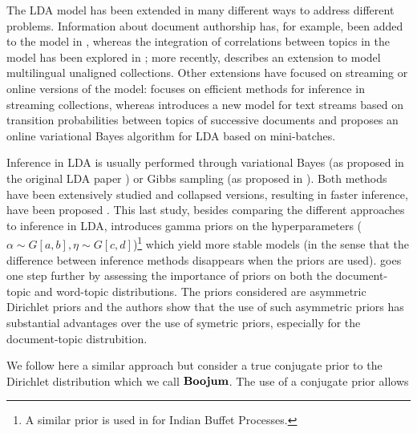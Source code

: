 
The LDA model \cite{blei_latent_2003} has been extended in many different ways to address different problems. Information about document authorship has, for example, been added to the model in \cite{Rosen_Zvi_2004}, whereas the integration of correlations between topics in the model has been explored in \cite{blei_correlated_2007}; more recently, \cite{Boyd_Graber_2009} describes an extension to model multilingual unaligned collections. Other extensions have focused on streaming or online versions of the model: \cite{Yao_2009} focuses on efficient methods for inference in streaming collections, whereas \cite{Wang_2012} introduces a new model for text streams based on transition probabilities between topics of successive documents and \cite{hoffman_online_2010} proposes an online variational Bayes algorithm for LDA based on mini-batches.

Inference in LDA is usually performed through variational Bayes (as proposed in the original LDA paper \cite{blei_latent_2003}) or Gibbs sampling (as proposed in \cite{griffiths04finding}). Both methods have been extensively studied and collapsed versions, resulting in faster inference, have been proposed \cite{teh_collapsed_2006,porteous_fast_2008}. This last study, besides comparing the different approaches to inference in LDA, introduces gamma priors on the hyperparameters ($\alpha \sim G[a,b], \eta \sim G[c,d]$)\footnote{A similar prior is used in \cite{Gorur_2006} for Indian Buffet Processes.} which yield more stable models (in the sense that the difference between inference methods disappears when the priors are used). \cite{wallach_rethinking_2009} goes one step further by assessing the importance of priors on both the document-topic and word-topic distributions. The priors considered are asymmetric Dirichlet priors and the authors show that the use of such asymmetric priors has substantial advantages over the use of symetric priors, especially for the document-topic distrubition.

We follow here a similar approach but consider a true conjugate prior to the Dirichlet distribution which we call $\mathbf{Boojum}$. The use of a conjugate prior allows 
